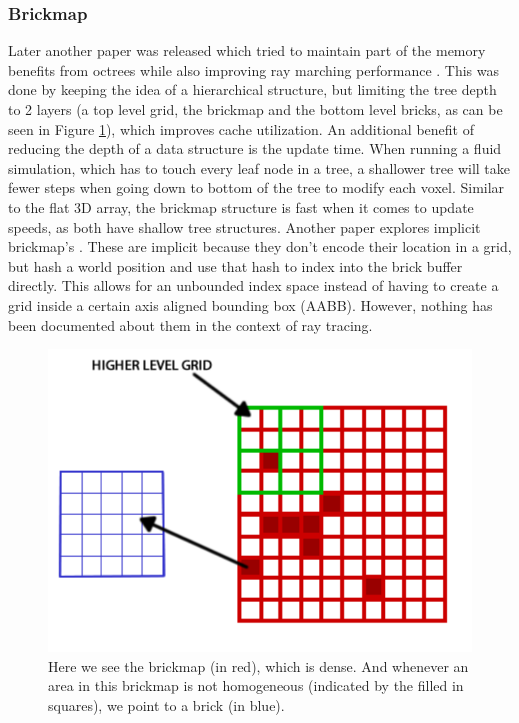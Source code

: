 \subsubsection{Brickmap} \label{related_work:voxel_data_structures:brickmap}
Later another paper was released which tried to maintain part of the memory benefits from octrees while also improving ray marching performance \cite{van2015real}. This was done by keeping the idea of a hierarchical structure, but limiting the tree depth to 2 layers (a top level grid, the brickmap and the bottom level bricks, as can be seen in Figure \ref{fig:brickmap}), which improves cache utilization. An additional benefit of reducing the depth of a data structure is the update time. When running a fluid simulation, which has to touch every leaf node in a tree, a shallower tree will take fewer steps when going down to bottom of the tree to modify each voxel. Similar to the flat 3D array, the brickmap structure is fast when it comes to update speeds, as both have shallow tree structures. Another paper explores implicit brickmap's \cite{niessner2013real}. These are implicit because they don't encode their location in a grid, but hash a world position and use that hash to index into the brick buffer directly. This allows for an unbounded index space instead of having to create a grid inside a certain axis aligned bounding box (AABB). However, nothing has been documented about them in the context of ray tracing.

\begin{figure}
    \centering
    \includegraphics[width=\linewidth]{figures/brickmap.png}
    \caption{Here we see the brickmap (in red), which is dense. And whenever an area in this brickmap is not homogeneous (indicated by the filled in squares), we point to a brick (in blue). \cite{van2015real}}
    \label{fig:brickmap}
\end{figure}
